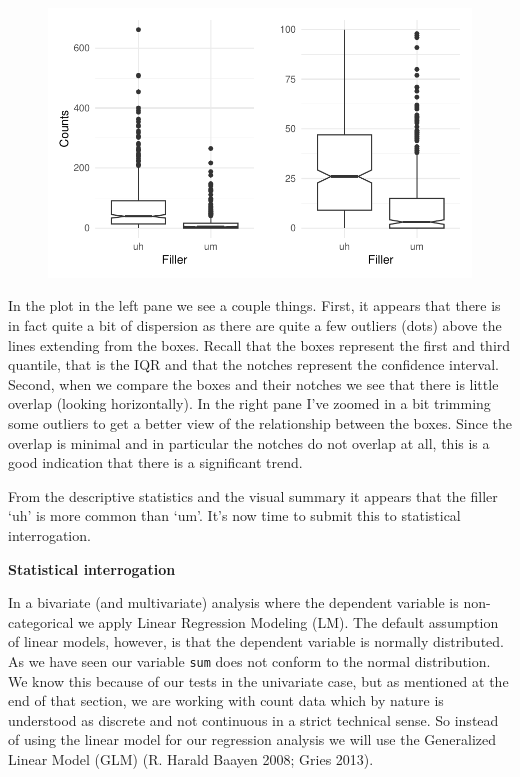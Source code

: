 \documentclass[
  letterpaper,
]{latex/krantz}
\begin{document}
\begin{figure}[h]

{\centering \includegraphics{inference_files/figure-pdf/i-bi-cont-visual-1.pdf}

}

\end{figure}

In the plot in the left pane we see a couple things. First, it appears
that there is in fact quite a bit of dispersion as there are quite a few
outliers (dots) above the lines extending from the boxes. Recall that
the boxes represent the first and third quantile, that is the IQR and
that the notches represent the confidence interval. Second, when we
compare the boxes and their notches we see that there is little overlap
(looking horizontally). In the right pane I've zoomed in a bit trimming
some outliers to get a better view of the relationship between the
boxes. Since the overlap is minimal and in particular the notches do not
overlap at all, this is a good indication that there is a significant
trend.

From the descriptive statistics and the visual summary it appears that
the filler `uh' is more common than `um'. It's now time to submit this
to statistical interrogation.

\textbf{Statistical interrogation}

In a bivariate (and multivariate) analysis where the dependent variable
is non-categorical we apply Linear Regression Modeling (LM). The default
assumption of linear models, however, is that the dependent variable is
normally distributed. As we have seen our variable \texttt{sum} does not
conform to the normal distribution. We know this because of our tests in
the univariate case, but as mentioned at the end of that section, we are
working with count data which by nature is understood as discrete and
not continuous in a strict technical sense. So instead of using the
linear model for our regression analysis we will use the Generalized
Linear Model (GLM) (R. Harald Baayen 2008; Gries 2013).
\end{document}
